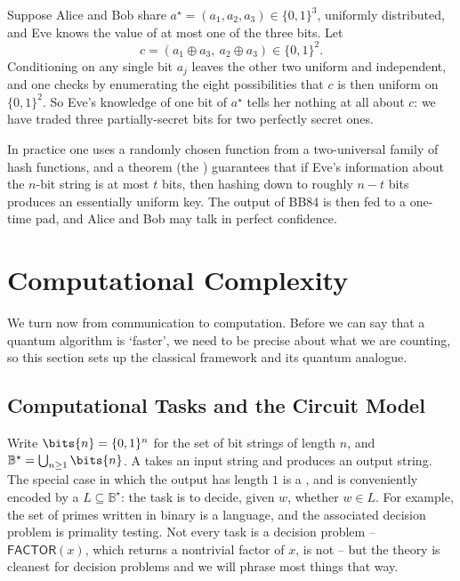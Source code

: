 \begin{example}
	Suppose Alice and Bob share $a^\star = (a_1,a_2,a_3) \in\{0,1\}^3$, uniformly distributed, and Eve knows the value of at most one of the three bits. Let
	$$c = \left(a_1\oplus a_3,\ a_2\oplus a_3\right) \in \{0,1\}^2.$$
	Conditioning on any single bit $a_j$ leaves the other two uniform and independent, and one checks by enumerating the eight possibilities that $c$ is then uniform on $\{0,1\}^2$. So Eve's knowledge of one bit of $a^\star$ tells her nothing at all about $c$: we have traded three partially-secret bits for two perfectly secret ones.
\end{example}

In practice one uses a randomly chosen function from a two-universal family of hash functions, and a theorem (the ) guarantees that if Eve's information about the $n$-bit string is at most $t$ bits, then hashing down to roughly $n - t$ bits produces an essentially uniform key. The output of BB84 is then fed to a one-time pad, and Alice and Bob may talk in perfect confidence.

\section{Computational Complexity}

We turn now from communication to computation. Before we can say that a quantum algorithm is `faster', we need to be precise about what we are counting, so this section sets up the classical framework and its quantum analogue.

\subsection{Computational Tasks and the Circuit Model}

Write $\bits{n} = \{0,1\}^n$ for the set of bit strings of length $n$, and $\mathbb B^\star = \bigcup_{n\geq1}\bits{n}$. A  takes an input string and produces an output string. The special case in which the output has length $1$ is a , and is conveniently encoded by a  $L\subseteq\mathbb B^\star$: the task is to decide, given $w$, whether $w\in L$. For example, the set of primes written in binary is a language, and the associated decision problem is primality testing. Not every task is a decision problem -- $\mathsf{FACTOR}(x)$, which returns a nontrivial factor of $x$, is not -- but the theory is cleanest for decision problems and we will phrase most things that way.

